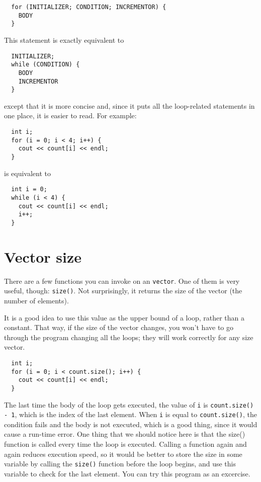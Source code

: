 \begin{lstlisting}
  for (INITIALIZER; CONDITION; INCREMENTOR) {
    BODY
  }
\end{lstlisting}
%
This statement is exactly equivalent to

\begin{lstlisting}
  INITIALIZER;
  while (CONDITION) {
    BODY
    INCREMENTOR
  }
\end{lstlisting}
%
except that it is more concise and, since it puts all the
loop-related statements in one place, it is easier to read.
For example:

\begin{lstlisting}
  int i;
  for (i = 0; i < 4; i++) {
    cout << count[i] << endl;
  }
\end{lstlisting}
%
is equivalent to 

\begin{lstlisting}
  int i = 0;
  while (i < 4) {
    cout << count[i] << endl;
    i++;
  }
\end{lstlisting}

\section{Vector size}

There are a few functions you can invoke on an
{\tt vector}.  One of them is very useful, though: {\tt size()}.
Not surprisingly, it returns the size of the vector (the number
of elements).

It is a good idea to use this value as the upper bound of a loop,
rather than a constant.  That way, if the size of the vector
changes, you won't have to go through the program changing all the
loops; they will work correctly for any size vector.

\begin{lstlisting}
  int i;
  for (i = 0; i < count.size(); i++) {
    cout << count[i] << endl;
  }
\end{lstlisting}
%
The last time the body of the loop gets executed, the value of {\tt i}
is {\tt count.size() - 1}, which is the index of the last element.  When
{\tt i} is equal to {\tt count.size()}, the condition fails and the body
is not executed, which is a good thing, since it would cause a
run-time error. One thing that we should notice here is that the
size() function is called every time the loop is executed. Calling
a function again and again reduces execution speed, so it would be better
to store the size in some variable by calling the {\tt size()} function
before the loop begins, and use this variable to check for the last element.
You can try this program as an excercise.

